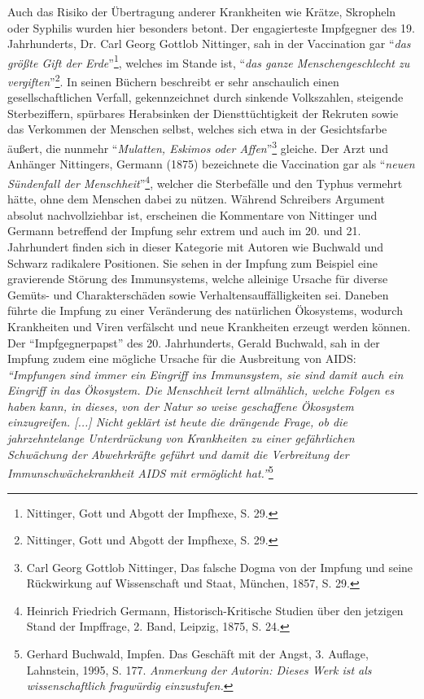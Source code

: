 \documentclass[
    a4paper,
    12pt,
    hyphens,
    chapterprefix=true,
    headheight=33pt,
    footheight=29pt,
    headings=optiontohead, %
]{scrartcl}
\begin{document}
{ Auch das Risiko der Übertragung anderer Krankheiten wie Krätze, Skropheln oder Syphilis wurden hier besonders betont. Der engagierteste Impfgegner des 19. Jahrhunderts, Dr. Carl Georg Gottlob Nittinger, sah in der Vaccination gar "`\textit{das größte Gift der Erde}"'\footnote{Nittinger, Gott und Abgott der Impfhexe, S. 29.}, welches im Stande ist, "`\textit{das ganze Menschengeschlecht zu vergiften}"'\footnote{Nittinger, Gott und Abgott der Impfhexe, S. 29.}. In seinen Büchern beschreibt er sehr anschaulich einen gesellschaftlichen Verfall, gekennzeichnet durch sinkende Volkszahlen, steigende Sterbeziffern, spürbares Herabsinken der Diensttüchtigkeit der Rekruten sowie das Verkommen der Menschen selbst, welches sich etwa in der Gesichtsfarbe äußert, die nunmehr "`\textit{Mulatten, Eskimos oder Affen}"'\footnote{Carl Georg Gottlob Nittinger, Das falsche Dogma von der Impfung und seine Rückwirkung auf Wissenschaft und Staat, München, 1857, S. 29.} gleiche. Der Arzt und Anhänger Nittingers, Germann (1875) bezeichnete die Vaccination gar als "`\textit{neuen Sündenfall der Menschheit}"'\footnote{Heinrich Friedrich Germann, Historisch-Kritische Studien über den jetzigen Stand der Impffrage, 2. Band, Leipzig, 1875, S. 24.}, welcher die Sterbefälle und den Typhus vermehrt hätte, ohne dem Menschen dabei zu nützen. Während Schreibers Argument absolut nachvollziehbar ist, erscheinen die Kommentare von Nittinger und Germann betreffend der Impfung sehr extrem und auch im 20. und 21. Jahrhundert finden sich in dieser Kategorie mit Autoren wie Buchwald und Schwarz radikalere Positionen. Sie sehen in der Impfung zum Beispiel eine gravierende Störung des Immunsystems, welche alleinige Ursache für diverse Gemüts- und Charakterschäden sowie Verhaltensauffälligkeiten sei. Daneben führte die Impfung zu einer Veränderung des natürlichen Ökosystems, wodurch Krankheiten und Viren verfälscht und neue Krankheiten erzeugt werden können. Der "`Impfgegnerpapst"' des 20. Jahrhunderts, Gerald Buchwald, sah in der Impfung zudem eine mögliche Ursache für die Ausbreitung von AIDS: \textit{"`Impfungen sind immer ein Eingriff ins Immunsystem, sie sind damit auch ein Eingriff in das Ökosystem. Die Menschheit lernt allmählich, welche Folgen es haben kann, in dieses, von der Natur so weise geschaffene Ökosystem einzugreifen. [...] Nicht geklärt ist heute die drängende Frage, ob die jahrzehntelange Unterdrückung von Krankheiten zu einer gefährlichen Schwächung der Abwehrkräfte geführt und damit die Verbreitung der Immunschwächekrankheit AIDS mit ermöglicht hat."'}\footnote{Gerhard Buchwald, Impfen. Das Geschäft mit der Angst, 3. Auflage, Lahnstein, 1995, S. 177. \textit{Anmerkung der Autorin: Dieses Werk ist als wissenschaftlich fragwürdig einzustufen.}} \\
}
\end{document}

